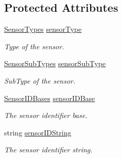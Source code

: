 \subsection*{Protected Attributes}
\begin{DoxyCompactItemize}
\item 
\hyperlink{class_a_rdev_kit_1_1_model_1_1_project_1_1_abstract_sensor_a1954adedcf2a2f61256c9b11fe0c8386}{Sensor\-Types} \hyperlink{class_a_rdev_kit_1_1_model_1_1_project_1_1_abstract_sensor_a01251db96ea5e0fb0abe1df0a129e751}{sensor\-Type}
\begin{DoxyCompactList}\small\item\em Type of the sensor. \end{DoxyCompactList}\item 
\hyperlink{class_a_rdev_kit_1_1_model_1_1_project_1_1_abstract_sensor_af7b41fc81d926ed779ca02ef894fcddf}{Sensor\-Sub\-Types} \hyperlink{class_a_rdev_kit_1_1_model_1_1_project_1_1_abstract_sensor_a29b9e916f374e31196689e9d7ac73123}{sensor\-Sub\-Type}
\begin{DoxyCompactList}\small\item\em Sub\-Type of the sensor. \end{DoxyCompactList}\item 
\hyperlink{class_a_rdev_kit_1_1_model_1_1_project_1_1_abstract_sensor_a8eecc60106e6a54a3e096c63a7d4d012}{Sensor\-I\-D\-Bases} \hyperlink{class_a_rdev_kit_1_1_model_1_1_project_1_1_abstract_sensor_a2f9524a6aba4331373c0c1968b2f6f4d}{sensor\-I\-D\-Base}
\begin{DoxyCompactList}\small\item\em The sensor identifier base. \end{DoxyCompactList}\item 
string \hyperlink{class_a_rdev_kit_1_1_model_1_1_project_1_1_abstract_sensor_ae12a6c3bfe5686d888d7e36c9b19df47}{sensor\-I\-D\-String}
\begin{DoxyCompactList}\small\item\em The sensor identifier string. \end{DoxyCompactList}\end{DoxyCompactItemize}
